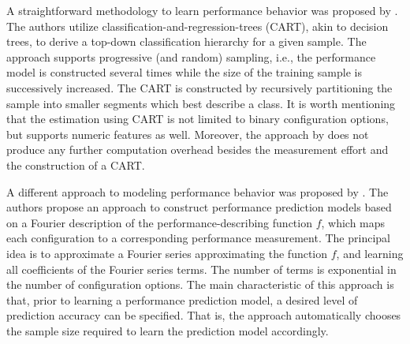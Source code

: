 A straightforward methodology to learn performance behavior was proposed by
\citep{guo_variability-aware_2013}.
The authors utilize classification-and-regression-trees (CART), akin to decision trees, to derive a top-down classification hierarchy for a
given sample. The approach supports progressive (and random) sampling, i.e.,
the performance model is constructed several times while the size of the
training sample is successively increased. The CART is constructed by
recursively partitioning the sample into smaller segments which best describe a
class. It is worth mentioning that the estimation using CART is not limited to
binary configuration options, but supports numeric features as well. Moreover,
the approach by \citep{guo_variability-aware_2013} does not produce any further
computation overhead besides the measurement effort and the construction of a CART.

A different approach to modeling performance behavior was
proposed by \cite{zhang_performance_2015}. The authors propose an approach to construct
performance prediction models based on a Fourier description of the
performance-describing function $f$, which maps each configuration to a
corresponding performance measurement. The principal idea is to approximate a
Fourier series approximating the function  $f$, and
learning all coefficients of the Fourier series terms.
The number of terms is exponential in the number of configuration options. The main
characteristic of this approach is that, prior to learning a performance
prediction model, a desired level of prediction accuracy can be specified. That
is, the approach automatically chooses the sample size required to learn the
prediction model accordingly.

